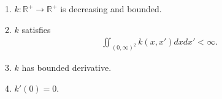 \documentclass[10pt]{article}
\newenvironment{Proof of lemma}{\noindent{\bf Proof of Lemma}}{\hfill$\Box$\newline}
\newenvironment{Proof of claim}{\noindent{\bf Proof of claim}}{\hfill$\Box$\newline}
\newenvironment{Proof of theorem}{\noindent{\bf Proof of Theorem}}{\hfill\scriptsize{$\Box$}\newline}
\newenvironment{Proof of theorems}{\noindent{\bf Proof of Theorems}}{\hfill$\Box$\newline}
\newenvironment{Proof of proposition}{\noindent{\bf Proof of Proposition}}{\hfill$\Box$\newline}
\newenvironment{Proof of propositions}{\noindent{\bf Proof of Propositions}}{\hfill$\Box$\newline}
\newenvironment{Proof of exercise}{\noindent{\it Proof of Exercise:}}{\hfill$\Box$}
\numberwithin{equation}{section}
\begin{document}
1. $k: \mathbb{R}^+ \to \mathbb{R}^+$ is decreasing and bounded.

2. $k$ satisfies
\begin{align}
    \iint_{(0,\infty)^2} k(x,x') dxdx' < \infty.
\end{align}

3. $k$ has bounded derivative.

4. $k'(0) = 0$.
 \nocite{*} 
\end{document}
